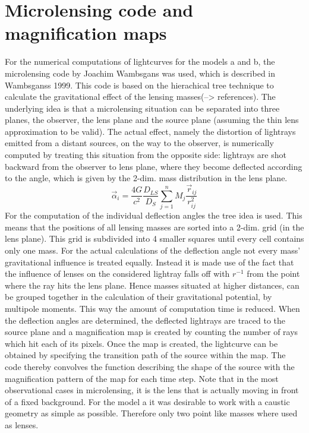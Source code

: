 \section{Microlensing code and magnification maps}
For the numerical computations of lightcurves for the models a and b, the microlensing code by Joachim Wambsgans was used, which is described in Wambsganss 1999. This code is based on the hierachical tree technique to calculate the gravitational effect of the lensing masses(--> references). The underlying idea is that a microlensing situation can be separated into three planes, the observer, the lens plane and the source plane (assuming the thin lens approximation to be valid). The actual effect, namely the distortion of lightrays emitted from a distant sources, on the way to the observer, is numerically computed by treating this situation from the opposite side: lightrays are shot backward from the observer to lens plane, where they become deflected according to the angle, which is given by the 2-dim. mass distribution in the lens plane.
\begin{equation}
\vec{\alpha}_{i}=\frac{4G}{c^{2}} \frac{D_{LS}}{D_{S}}\sum_{j=1}^{n}M_j \frac{\vec{r}_{ij}}{r^2_{ij}} 
\end{equation}  
For the computation of the individual deflection angles the tree idea is used. This means that the positions of all lensing masses are sorted into a 2-dim. grid (in the lens plane). This grid is subdivided into 4 smaller squares until every cell contains only one mass. For the actual calculations of the deflection angle not every mass' gravitational influence is treated equally. Instead it is made use of the fact that the influence of lenses on the considered lightray falls off with $r^{-1}$ from the point where the ray hits the lens plane. Hence masses situated at higher distances, can be grouped together in the calculation of their gravitational potential, by multipole moments. This way the amount of computation time is reduced. 
When the deflection angles are determined, the deflected lightrays are traced to the source plane and a magnification map is created by counting the number of rays which hit each of its pixels. 
Once the map is created, the lightcurve can be obtained by specifying the transition path of the source within the map. The code thereby convolves the function describing the shape of the source with the magnification pattern of the map for each time step. Note that in the most observational cases in microlensing, it is the lens that is actually moving in front of a fixed background. 
For the model a it was desirable to work with a caustic geometry as simple as possible. Therefore only two point like masses where used as lenses.  
